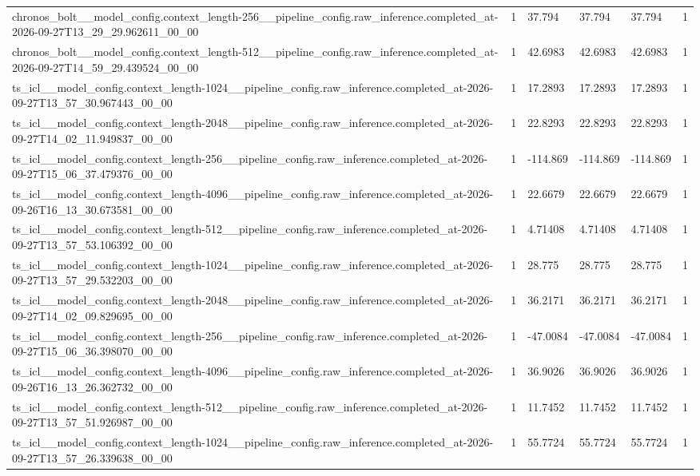 \begin{tabular}{llllll}
chronos\_bolt\_\_model\_config.context\_length-256\_\_pipeline\_config.raw\_inference.completed\_at-2026-09-27T13\_29\_29.962611\_00\_00 & 1 & 37.794 & 37.794 & 37.794 & 1 \\
chronos\_bolt\_\_model\_config.context\_length-512\_\_pipeline\_config.raw\_inference.completed\_at-2026-09-27T14\_59\_29.439524\_00\_00 & 1 & 42.6983 & 42.6983 & 42.6983 & 1 \\
ts\_icl\_\_model\_config.context\_length-1024\_\_pipeline\_config.raw\_inference.completed\_at-2026-09-27T13\_57\_30.967443\_00\_00 & 1 & 17.2893 & 17.2893 & 17.2893 & 1 \\
ts\_icl\_\_model\_config.context\_length-2048\_\_pipeline\_config.raw\_inference.completed\_at-2026-09-27T14\_02\_11.949837\_00\_00 & 1 & 22.8293 & 22.8293 & 22.8293 & 1 \\
ts\_icl\_\_model\_config.context\_length-256\_\_pipeline\_config.raw\_inference.completed\_at-2026-09-27T15\_06\_37.479376\_00\_00 & 1 & -114.869 & -114.869 & -114.869 & 1 \\
ts\_icl\_\_model\_config.context\_length-4096\_\_pipeline\_config.raw\_inference.completed\_at-2026-09-26T16\_13\_30.673581\_00\_00 & 1 & 22.6679 & 22.6679 & 22.6679 & 1 \\
ts\_icl\_\_model\_config.context\_length-512\_\_pipeline\_config.raw\_inference.completed\_at-2026-09-27T13\_57\_53.106392\_00\_00 & 1 & 4.71408 & 4.71408 & 4.71408 & 1 \\
ts\_icl\_\_model\_config.context\_length-1024\_\_pipeline\_config.raw\_inference.completed\_at-2026-09-27T13\_57\_29.532203\_00\_00 & 1 & 28.775 & 28.775 & 28.775 & 1 \\
ts\_icl\_\_model\_config.context\_length-2048\_\_pipeline\_config.raw\_inference.completed\_at-2026-09-27T14\_02\_09.829695\_00\_00 & 1 & 36.2171 & 36.2171 & 36.2171 & 1 \\
ts\_icl\_\_model\_config.context\_length-256\_\_pipeline\_config.raw\_inference.completed\_at-2026-09-27T15\_06\_36.398070\_00\_00 & 1 & -47.0084 & -47.0084 & -47.0084 & 1 \\
ts\_icl\_\_model\_config.context\_length-4096\_\_pipeline\_config.raw\_inference.completed\_at-2026-09-26T16\_13\_26.362732\_00\_00 & 1 & 36.9026 & 36.9026 & 36.9026 & 1 \\
ts\_icl\_\_model\_config.context\_length-512\_\_pipeline\_config.raw\_inference.completed\_at-2026-09-27T13\_57\_51.926987\_00\_00 & 1 & 11.7452 & 11.7452 & 11.7452 & 1 \\
ts\_icl\_\_model\_config.context\_length-1024\_\_pipeline\_config.raw\_inference.completed\_at-2026-09-27T13\_57\_26.339638\_00\_00 & 1 & 55.7724 & 55.7724 & 55.7724 & 1 \\

\end{tabular}
